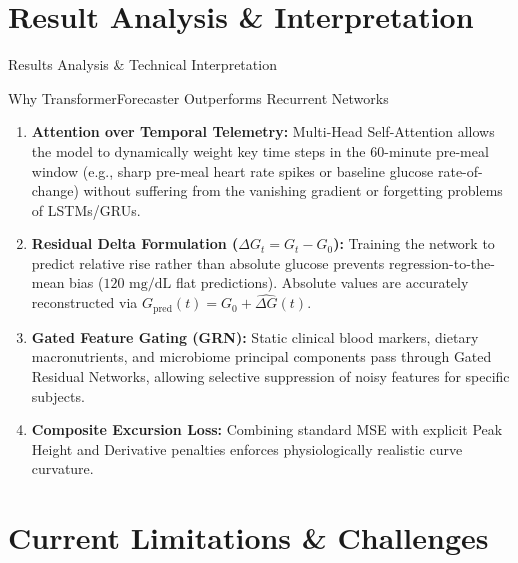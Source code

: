 \documentclass[10pt,aspectratio=169]{beamer}
\begin{document}
\section{Result Analysis \& Interpretation}

\begin{frame}{Results Analysis \& Technical Interpretation}
    \justifying
    \begin{block}{Why TransformerForecaster Outperforms Recurrent Networks}
        \begin{enumerate}
            \justifying
            \item \textbf{Attention over Temporal Telemetry:} Multi-Head Self-Attention allows the model to dynamically weight key time steps in the 60-minute pre-meal window (e.g., sharp pre-meal heart rate spikes or baseline glucose rate-of-change) without suffering from the vanishing gradient or forgetting problems of LSTMs/GRUs.
            \item \textbf{Residual Delta Formulation ($\Delta G_t = G_t - G_0$):} Training the network to predict relative rise rather than absolute glucose prevents regression-to-the-mean bias ($120\text{ mg/dL}$ flat predictions). Absolute values are accurately reconstructed via $G_{\text{pred}}(t) = G_0 + \hat{\Delta G}(t)$.
            \item \textbf{Gated Feature Gating (GRN):} Static clinical blood markers, dietary macronutrients, and microbiome principal components pass through Gated Residual Networks, allowing selective suppression of noisy features for specific subjects.
            \item \textbf{Composite Excursion Loss:} Combining standard MSE with explicit Peak Height and Derivative penalties enforces physiologically realistic curve curvature.
        \end{enumerate}
    \end{block}
\end{frame}

\section{Current Limitations \& Challenges}
\end{document}
